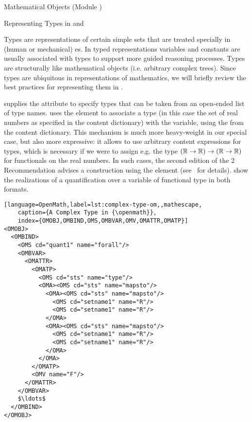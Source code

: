 \begin{tchapter}[id=mobj,short=Mathematical Objects]{Mathematical Objects (Module {})}
\begin{tsection}[id=mobj:types]{Representing Types in {\cmathml} and {\openmath}}


  Types are representations of certain simple sets that are treated specially
  in (human or mechanical) {es}. In typed representations
  variables and constants are usually associated with types to support more guided
  reasoning processes. Types are structurally like mathematical objects (i.e. arbitrary
  complex trees). Since types are ubiquitous in representations of mathematics, we will
  briefly review the best practices for representing them in {\omdoc}.

  {\mathml} supplies the {}
  attribute to specify types that can be taken from an open-ended list of type names.
  {\openmath} uses the {} element to associate a type (in this
  case the set of real numbers as specified in the {} content
  dictionary) with the variable, using the {} {}
  from the {} content dictionary. This mechanism is much more heavy-weight
  in our special case, but also more expressive: it allows to use arbitrary content
  expressions for types, which is necessary if we were to assign e.g. the type
  $({\mathbb{R}}\to{\mathbb{R}})\to({\mathbb{R}}\to{\mathbb{R}})$ for functionals on the real numbers. In such cases, the
  second edition of the {\mathml}2 Recommendation advises a construction using the
  {} element (see~\cite{DevKoh:stm03} for details).
  {} show the realizations of a
  quantification over a variable of functional type in both formats.

\begin{lstlisting}[language=OpenMath,label=lst:complex-type-om,,mathescape,
    caption={A Complex Type in {\openmath}},
    index={OMOBJ,OMBIND,OMS,OMBVAR,OMV,OMATTR,OMATP}]
<OMOBJ>                            
  <OMBIND>                          
    <OMS cd="quant1" name="forall"/> 
    <OMBVAR>                         
      <OMATTR>                        
        <OMATP>                        
          <OMS cd="sts" name="type"/>
          <OMA><OMS cd="sts" name="mapsto"/>   
            <OMA><OMS cd="sts" name="mapsto"/>   
              <OMS cd="setname1" name="R"/>  
              <OMS cd="setname1" name="R"/>
            </OMA>
            <OMA><OMS cd="sts" name="mapsto"/>   
              <OMS cd="setname1" name="R"/>  
              <OMS cd="setname1" name="R"/>
            </OMA>
          </OMA>  
        </OMATP>                       
        <OMV name="F"/>                
      </OMATTR>                        
    </OMBVAR>                        
    $\ldots$
  </OMBIND>                         
</OMOBJ>
\end{lstlisting}


\end{tsection}
\end{tchapter}
